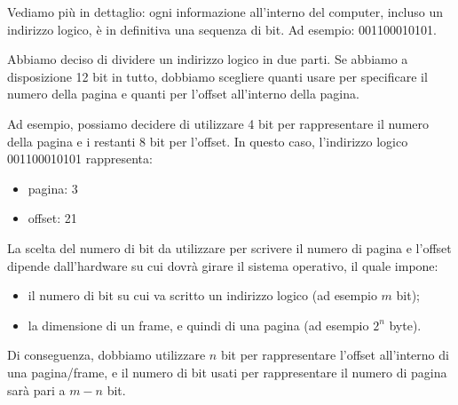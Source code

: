 Vediamo più in dettaglio: ogni informazione all’interno del computer, incluso un indirizzo logico, è in definitiva una sequenza di bit. Ad esempio: 001100010101.

Abbiamo deciso di dividere un indirizzo logico in due parti. Se abbiamo a disposizione 12 bit in tutto, dobbiamo scegliere quanti usare per specificare il numero della pagina e quanti per l’offset all’interno della pagina.

Ad esempio, possiamo decidere di utilizzare 4 bit per rappresentare il numero della pagina e i restanti 8 bit per l’offset. In questo caso, l’indirizzo logico 001100010101 rappresenta:
\begin{itemize}
    \item pagina: 3
    \item offset: 21
\end{itemize}

La scelta del numero di bit da utilizzare per scrivere il numero di pagina e l’offset dipende dall’hardware su cui dovrà girare il sistema operativo, il quale impone:
\begin{itemize}
    \item il numero di bit su cui va scritto un indirizzo logico (ad esempio $m$ bit);
    \item la dimensione di un frame, e quindi di una pagina (ad esempio $2^n$ byte).
\end{itemize}

Di conseguenza, dobbiamo utilizzare $n$ bit per rappresentare l'offset all'interno di una pagina/frame, e il numero di bit usati per rappresentare il numero di pagina sarà pari a $m - n$ bit.



